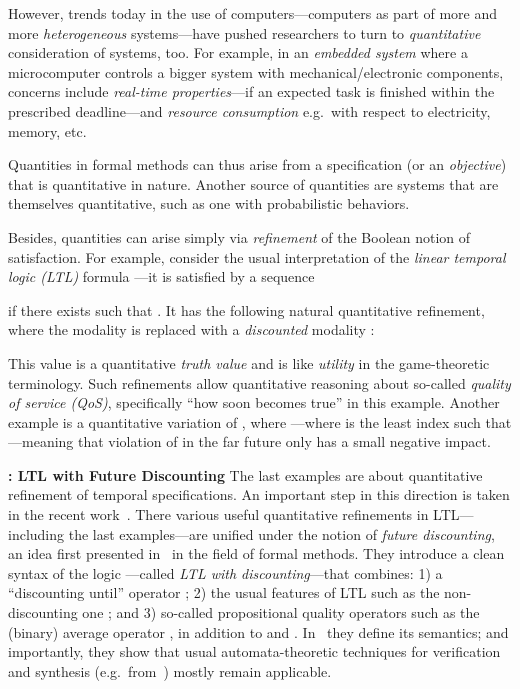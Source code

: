 \documentclass[a4paper,USenglish,numberwithinsect]{lipics}
\theoremstyle{definition}
\theoremstyle{remark}
\theoremstyle{plain}
\begin{document}
However, trends today in the use of computers---computers as
part of more and more \emph{heterogeneous} systems---have pushed
researchers to turn to \emph{quantitative} consideration of systems,
too. For example, in an \emph{embedded system} where
a microcomputer 
controls a bigger system  with  mechanical/electronic components, 
concerns include  \emph{real-time properties}---if an expected task
is finished within the prescribed deadline---and \emph{resource consumption}
e.g.\ with respect to electricity, memory, etc. 

Quantities in formal methods can thus arise from a specification (or
 an \emph{objective}) that is quantitative in nature. Another
source of quantities are systems that are themselves quantitative, such
as one with
probabilistic 
behaviors.


Besides, quantities  can arise simply via \emph{refinement} of the Boolean notion of
 satisfaction. For example, consider 
the usual interpretation of the \emph{linear
 temporal logic (LTL)} formula
 ---it 
is satisfied by a sequence 
 
if there exists  such that . 
 It has the following natural
 quantitative refinement, where the modality  is replaced with 
 a \emph{discounted} modality :

This value  is a
quantitative \emph{truth value} and is like \emph{utility} in the
game-theoretic terminology.
Such  refinements allow quantitative  reasoning about
so-called \emph{quality of service (QoS)}, specifically ``how soon 
becomes true'' in this example. Another example is a quantitative
variation  of , where
---where  is the least index such that
  ---meaning that violation of  in the far future only has a small
negative
impact.


\noindent\textbf{: LTL with Future Discounting}\quad
The last examples are about quantitative refinement of temporal
specifications. An important step in this direction is taken
in the recent work~\cite{AlmagorBK14}.
There various useful quantitative refinements in
LTL---including the last examples---are unified under the notion of
\emph{future discounting}, an idea first presented in~\cite{AlfaroHM03}
in the field of formal methods. They introduce a clean syntax of
the logic  ---called
\emph{LTL with discounting}---that combines: 1) a ``discounting until'' operator
; 2) the usual features of LTL such as the non-discounting
one ;  and 3) so-called propositional
quality operators such as the (binary) average operator , in
addition to  and . In~\cite{AlmagorBK14} they define its semantics; and importantly, they
show that  usual automata-theoretic techniques for verification and
synthesis (e.g.\ from~\cite{Vardi96anautomata-theoretic,PnueliR89})
mostly remain applicable.  
\end{document}
